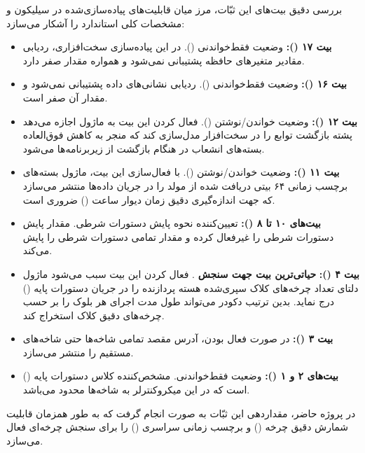 بررسی دقیق بیت‌های این ثبّات، مرز میان قابلیت‌های پیاده‌سازی‌شده در سیلیکون  و مشخصات کلی استاندارد  را آشکار می‌سازد:
\begin{itemize}
    \item \textbf{بیت ۱۷ ():} وضعیت فقط‌خواندنی (). در این پیاده‌سازی سخت‌افزاری، ردیابی مقادیر متغیرهای حافظه پشتیبانی نمی‌شود و همواره مقدار صفر دارد.
    \item \textbf{بیت ۱۶ ():} وضعیت فقط‌خواندنی (). ردیابی نشانی‌های داده پشتیبانی نمی‌شود و مقدار آن صفر است.
    \item \textbf{بیت ۱۲ ():} وضعیت خواندن/نوشتن (). فعال کردن این بیت به ماژول  اجازه می‌دهد پشته بازگشت توابع را در سخت‌افزار مدل‌سازی کند که منجر به کاهش فوق‌العاده بسته‌های انشعاب در هنگام بازگشت از زیربرنامه‌ها می‌شود.
    \item \textbf{بیت ۱۱ ():} وضعیت خواندن/نوشتن (). با فعال‌سازی این بیت، ماژول  بسته‌های برچسب زمانی ۶۴ بیتی دریافت شده از مولد  را در جریان داده‌ها منتشر می‌سازد که جهت اندازه‌گیری دقیق زمان دیوار ساعت () ضروری است.
    \item \textbf{بیت‌های ۱۰ تا ۸ ():} تعیین‌کننده نحوه پایش دستورات شرطی. مقدار  پایش دستورات شرطی را غیرفعال کرده و مقدار  تمامی دستورات شرطی را پایش می‌کند.
    \item \textbf{بیت ۴ ():} \textbf{حیاتی‌ترین بیت جهت سنجش }. فعال کردن این بیت سبب می‌شود ماژول  دلتای تعداد چرخه‌های کلاک سپری‌شده هسته پردازنده را در جریان دستورات پایه () درج نماید. بدین ترتیب دکودر می‌تواند طول مدت اجرای هر بلوک را بر حسب چرخه‌های دقیق کلاک استخراج کند.
    \item \textbf{بیت ۳ ():} در صورت فعال بودن، آدرس مقصد تمامی شاخه‌ها حتی شاخه‌های مستقیم را منتشر می‌سازد.
    \item \textbf{بیت‌های ۲ و ۱ ():} وضعیت فقط‌خواندنی. مشخص‌کننده کلاس دستورات پایه () است که در این میکروکنترلر به شاخه‌ها محدود می‌باشد.
\end{itemize}

در پروژه حاضر، مقداردهی این ثبّات به صورت  انجام گرفت که به طور همزمان قابلیت شمارش دقیق چرخه () و برچسب زمانی سراسری () را برای سنجش چرخه‌ای  فعال می‌سازد.

